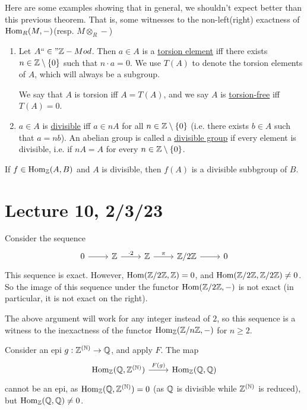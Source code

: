 \documentclass[x11names,reqno,14pt]{extarticle}
\newcommand{\fin}{``\in"}
\begin{document}
Here are some examples showing that in general, we shouldn't expect better than this previous theorem. That is, some witnesses to the non-left(right) exactness of ${\mathrm{Hom}}_R(M, -)$(resp. $M\otimes_R-$)


\begin{enumerate}[label=(\roman*)]

\item Let $A\fin\Z-Mod$. Then $a \in A$ is a \underline{torsion element} iff there exists $n\in\mathbb{Z}\setminus\{0\}$ such that $n\cdot a = 0$. We use $T(A)$ to denote the torsion elements of $A$, which will always be a subgroup. 

We say that $A$ is torsion iff $A = T(A)$, and we say $A$ is \underline{torsion-free} iff $T(A) = 0$. 

\item $a \in A$ is \underline{divisible} iff $a \in nA$ for all $n \in \mathbb{Z}\setminus\{0\}$ (i.e. there exists $b \in A$ such that $a = nb$). An abelian group is called a \underline{divisible group} if every element is divisible, i.e. if $nA = A$ for every $n\in\mathbb{Z}\setminus\{0\}$. 

\end{enumerate}

\rem 

If $f\in{\mathrm{Hom}}_{\mathbb{Z}}(A, B)$ and $A$ is divisible, then $f(A)$ is a divisible subbgroup of $B$. 

\section*{Lecture 10, 2/3/23}

Consider the sequence
\[
\exactshort{\Z}{\cdot 2}{\Z}{\pi}{\Z/2\Z}
\]
This sequence is exact. However, ${\mathrm{Hom}}(\mathbb{Z}/2\mathbb{Z}, \mathbb{Z}) = 0$, and ${\mathrm{Hom}}(\mathbb{Z}/2\mathbb{Z},\mathbb{Z}/2\mathbb{Z})\neq 0$. So the image of this sequence under the functor ${\mathrm{Hom}}(\mathbb{Z}/2\mathbb{Z}, -)$ is not exact (in particular, it is not exact on the right). 

The above argument will work for any integer instead of $2$, so this sequence is a witness to the inexactness of the functor ${\mathrm{Hom}}_{\mathbb{Z}}(\mathbb{Z}/n\mathbb{Z}, -)$ for $n \geq 2$. 

Consider an epi $g:\mathbb{Z}^{(\mathbb{N})}\to\mathbb{Q}$, and apply $F$. The map
\[
\begin{tikzcd}
\Hom_{\Z}(\Q,\Z^{(\N)}) \ar[r, "F(g)"]&\Hom_{\Z}(\Q,\Q)
\end{tikzcd}
\]
cannot be an epi, as ${\mathrm{Hom}}_{\mathbb{Z}}(\mathbb{Q},\mathbb{Z}^{(\mathbb{N})}) = 0$ (as $\mathbb{Q}$ is divisible while $\mathbb{Z}^{(\mathbb{N})}$ is reduced), but ${\mathrm{Hom}}_{\mathbb{Z}}(\mathbb{Q},\mathbb{Q})\neq0$. 
\end{document}
